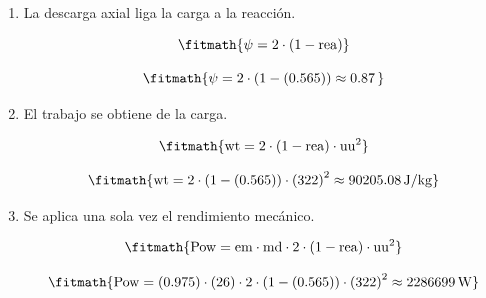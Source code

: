 \begin{enumerate}

\item La descarga axial liga la carga a la reacción.

\[\fitmath{\psi=2\cdot \left(1-\mathrm{rea}\right)}\]

\[\fitmath{\psi=2\cdot \left(1-(0.565)\right)\approx 0.87\,}\]

\item El trabajo se obtiene de la carga.

\[\fitmath{\mathrm{wt}=2\cdot \left(1-\mathrm{rea}\right)\cdot {\mathrm{uu}}^{2}}\]

\[\fitmath{\mathrm{wt}=2\cdot \left(1-(0.565)\right)\cdot {(322)}^{2}\approx 90205.08\,\mathrm{J/kg}}\]

\item Se aplica una sola vez el rendimiento mecánico.

\[\fitmath{\mathrm{Pow}=\mathrm{em}\cdot \mathrm{md}\cdot 2\cdot \left(1-\mathrm{rea}\right)\cdot {\mathrm{uu}}^{2}}\]

\[\fitmath{\mathrm{Pow}=(0.975)\cdot (26)\cdot 2\cdot \left(1-(0.565)\right)\cdot {(322)}^{2}\approx 2286699\,\mathrm{W}}\]

\end{enumerate}

